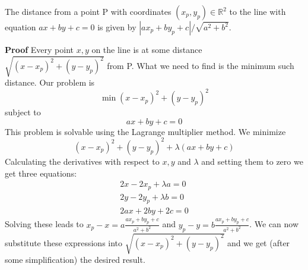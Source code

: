 \documentclass[12pt]{article}
\begin{document}
The distance from a point P with coordinates $(x_p, y_p) \in \mathbb{R}^2$ to the line with equation $ax + by + c = 0$ is given by $|ax_p + by_p+c|/\sqrt{a^2+b^2}$.

\textbf{Proof}  Every point $x,y$ on the line is at some distance $\sqrt{(x-x_p)^2+(y-y_p)^2}$ from P.  What we need to find is the minimum such distance.  Our problem is
$$
\min (x-x_p)^2+(y-y_p)^2
$$
subject to
$$
ax + by +c = 0
$$
This problem is solvable using the Lagrange multiplier method.  We minimize
$$
(x-x_p)^2+(y-y_p)^2 + \lambda(ax + by +c)
$$
Calculating the derivatives with respect to $x,y$ and $\lambda$ and setting them to zero we get three equations:
\begin{eqnarray}
2x - 2x_p + \lambda a = 0\\
2y - 2y_p + \lambda b = 0\\
2ax + 2by +2c =0
\end{eqnarray}
Solving these leads to 
$x_p-x = a\frac{ax_p + by_p+c}{a^2+b^2}$ and $y_p-y = b\frac{ax_p + by_p+c}{a^2+b^2}$.
We can now substitute these expressions into $\sqrt{(x-x_p)^2+(y-y_p)^2}$ and we get (after some simplification) the desired result.
\end{document}
